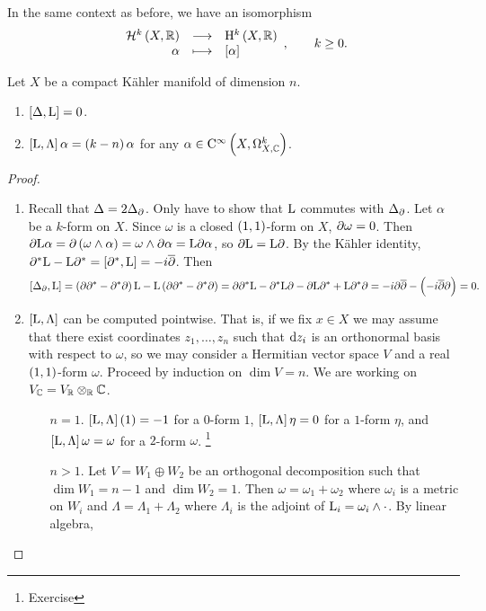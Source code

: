 \begin{corollary}
In the same context as before, we have an isomorphism
$$ \function{\HHH^k\br{X, \RR}}{\H^k\br{X, \RR}}{\alpha}{\sbr{\alpha}}, \qquad k \ge 0. $$
\end{corollary}

\begin{lemma}
\label{lem:6.41}
Let $ X $ be a compact K\"ahler manifold of dimension $ n $.
\begin{enumerate}
\item $ \sbr{\Delta, \L} = 0 $.
\item $ \sbr{\L, \Lambda}\alpha = \br{k - n}\alpha $ for any $ \alpha \in \COC{X}{k} $.
\end{enumerate}
\end{lemma}

\begin{proof}
\hfill
\begin{enumerate}
\item Recall that $ \Delta = 2\Delta_\partial $. Only have to show that $ \mathrm{L} $ commutes with $ \Delta_\partial $. Let $ \alpha $ be a $ k $-form on $ X $. Since $ \omega $ is a closed $ \br{1, 1} $-form on $ X $, $ \partial\omega = 0 $. Then $ \da\L\alpha = \da\br{\omega \wedge \alpha} = \omega \wedge \da\alpha = \L\da\alpha $, so $ \partial\mathrm{L} = \mathrm{L}\partial $. By the K\"ahler identity, $ \da^*\L - \L\da^* = \sbr{\da^*, \L} = -i\dab $. Then
$$ \sbr{\Delta_\da, \L} = \br{\da\da^* - \da^*\da}\L - \L\br{\da\da^* - \da^*\da} = \da\da^*\L - \da^*\L\da - \da\L\da^* + \L\da^*\da = -i\da\dab - \br{-i\dab\da} = 0. $$
\item $ \sbr{\L, \Lambda} $ can be computed pointwise. That is, if we fix $ x \in X $ we may assume that there exist coordinates $ z_1, \dots, z_n $ such that $ \mathrm{d} z_i $ is an orthonormal basis with respect to $ \omega $, so we may consider a Hermitian vector space $ V $ and a real $ \br{1, 1} $-form $ \omega $. Proceed by induction on $ \dim V = n $. We are working on $ V_{\mathbb{C}} = V_{\mathbb{R}} \otimes_{\mathbb{R}} \mathbb{C} $.
\begin{itemize}[leftmargin=0.5in]
\item[$ n = 1 $.] $ \sbr{\L, \Lambda}\br{1} = -1 $ for a $ 0 $-form $ 1 $, $ \sbr{\L, \Lambda}\eta = 0 $ for a $ 1 $-form $ \eta $, and $ \sbr{\L, \Lambda}\omega = \omega $ for a $ 2 $-form $ \omega $. \footnote{Exercise}
\item[$ n > 1 $.] Let $ V = W_1 \oplus W_2 $ be an orthogonal decomposition such that $ \dim W_1 = n - 1 $ and $ \dim W_2 = 1 $. Then $ \omega = \omega_1 + \omega_2 $ where $ \omega_i $ is a metric on $ W_i $ and $ \Lambda = \Lambda_1 + \Lambda_2 $ where $ \Lambda_i $ is the adjoint of $ \mathrm{L}_i = \omega_i \wedge \cdot $. By linear algebra,

\end{itemize}
\end{enumerate}
\end{proof}
